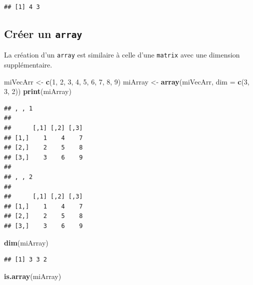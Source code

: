\documentclass[
]{book}
\newenvironment{Shaded}{\begin{snugshade}}{\end{snugshade}}
\newcommand{\DataTypeTok}[1]{\textcolor[rgb]{0.13,0.29,0.53}{#1}}
\newcommand{\DecValTok}[1]{\textcolor[rgb]{0.00,0.00,0.81}{#1}}
\newcommand{\KeywordTok}[1]{\textcolor[rgb]{0.13,0.29,0.53}{\textbf{#1}}}
\newcommand{\NormalTok}[1]{#1}
\newcommand{\StringTok}[1]{\textcolor[rgb]{0.31,0.60,0.02}{#1}}
\begin{document}
\begin{verbatim}
## [1] 4 3
\end{verbatim}

\hypertarget{cruxe9er-un-array}{%
\subsection{\texorpdfstring{Créer un \texttt{array}}{Créer un array}}\label{cruxe9er-un-array}}

La création d'un \texttt{array} est similaire à celle d'une \texttt{matrix} avec une dimension supplémentaire.

\begin{Shaded}
\begin{Highlighting}[]
\NormalTok{miVecArr <-}\StringTok{ }\KeywordTok{c}\NormalTok{(}\DecValTok{1}\NormalTok{, }\DecValTok{2}\NormalTok{, }\DecValTok{3}\NormalTok{, }\DecValTok{4}\NormalTok{, }\DecValTok{5}\NormalTok{, }\DecValTok{6}\NormalTok{, }\DecValTok{7}\NormalTok{, }\DecValTok{8}\NormalTok{, }\DecValTok{9}\NormalTok{)}
\NormalTok{miArray <-}\StringTok{ }\KeywordTok{array}\NormalTok{(miVecArr, }\DataTypeTok{dim =} \KeywordTok{c}\NormalTok{(}\DecValTok{3}\NormalTok{, }\DecValTok{3}\NormalTok{, }\DecValTok{2}\NormalTok{))}
\KeywordTok{print}\NormalTok{(miArray)}
\end{Highlighting}
\end{Shaded}

\begin{verbatim}
## , , 1
## 
##      [,1] [,2] [,3]
## [1,]    1    4    7
## [2,]    2    5    8
## [3,]    3    6    9
## 
## , , 2
## 
##      [,1] [,2] [,3]
## [1,]    1    4    7
## [2,]    2    5    8
## [3,]    3    6    9
\end{verbatim}

\begin{Shaded}
\begin{Highlighting}[]
\KeywordTok{dim}\NormalTok{(miArray)}
\end{Highlighting}
\end{Shaded}

\begin{verbatim}
## [1] 3 3 2
\end{verbatim}

\begin{Shaded}
\begin{Highlighting}[]
\KeywordTok{is.array}\NormalTok{(miArray)}
\end{Highlighting}
\end{Shaded}
\end{document}
